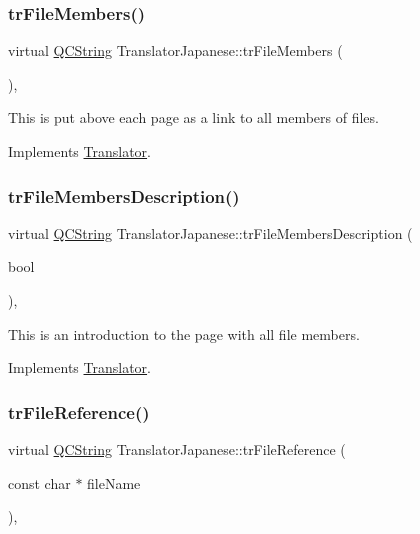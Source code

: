 \subsubsection{\texorpdfstring{trFileMembers()}{trFileMembers()}}
{\footnotesize\ttfamily virtual \mbox{\hyperlink{class_q_c_string}{Q\+C\+String}} Translator\+Japanese\+::tr\+File\+Members (\begin{DoxyParamCaption}{ }\end{DoxyParamCaption})\hspace{0.3cm}{\ttfamily [inline]}, {\ttfamily [virtual]}}

This is put above each page as a link to all members of files. 

Implements \mbox{\hyperlink{class_translator}{Translator}}.

\mbox{\label{class_translator_japanese_a4dde09015f9b85617fcc24ff893a085e}} 
\subsubsection{\texorpdfstring{trFileMembersDescription()}{trFileMembersDescription()}}
{\footnotesize\ttfamily virtual \mbox{\hyperlink{class_q_c_string}{Q\+C\+String}} Translator\+Japanese\+::tr\+File\+Members\+Description (\begin{DoxyParamCaption}\item[{bool}]{ }\end{DoxyParamCaption})\hspace{0.3cm}{\ttfamily [inline]}, {\ttfamily [virtual]}}

This is an introduction to the page with all file members. 

Implements \mbox{\hyperlink{class_translator}{Translator}}.

\mbox{\label{class_translator_japanese_af0c237ac54e165970832733449e8a15c}} 
\subsubsection{\texorpdfstring{trFileReference()}{trFileReference()}}
{\footnotesize\ttfamily virtual \mbox{\hyperlink{class_q_c_string}{Q\+C\+String}} Translator\+Japanese\+::tr\+File\+Reference (\begin{DoxyParamCaption}\item[{const char $\ast$}]{file\+Name }\end{DoxyParamCaption})\hspace{0.3cm}{\ttfamily [inline]}, {\ttfamily [virtual]}}

